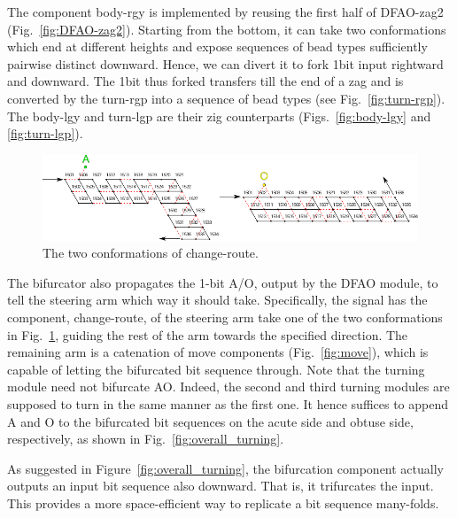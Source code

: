 The component body-rgy is implemented by reusing the first half of DFAO-zag2 (Fig.~\ref{fig:DFAO-zag2}). 
Starting from the bottom, it can take two conformations which end at different heights and expose sequences of bead types sufficiently pairwise distinct downward. 
Hence, we can divert it to fork 1bit input rightward and downward. 
The 1bit thus forked transfers till the end of a zag and is converted by the turn-rgp into a sequence of bead types (see Fig.~\ref{fig:turn-rgp}). 
The body-lgy and turn-lgp are their zig counterparts (Figs.~\ref{fig:body-lgy} and \ref{fig:turn-lgp}). 


\begin{figure}[h]
\centering
\includegraphics[width=\linewidth]{pic/change_route.pdf}
\caption{The two conformations of change-route.}
\label{fig:change_route}
\end{figure}

The bifurcator also propagates the 1-bit A/O, output by the DFAO module, to tell the steering arm which way it should take.
Specifically, the signal has the component, change-route, of the steering arm take one of the two conformations in Fig.~\ref{fig:change_route}, guiding the rest of the arm towards the specified direction.
The remaining arm is a catenation of move components (Fig.~\ref{fig:move}), which is capable of letting the bifurcated bit sequence through.  
Note that the turning module need not bifurcate AO.
Indeed, the second and third turning modules are supposed to turn in the same manner as the first one.
It hence suffices to append A and O to the bifurcated bit sequences on the acute side and obtuse side, respectively, as shown in Fig.~\ref{fig:overall_turning}.

\begin{remark}
As suggested in Figure~\ref{fig:overall_turning}, the bifurcation component actually outputs an input bit sequence also downward.
That is, it trifurcates the input.
This provides a more space-efficient way to replicate a bit sequence many-folds.
\end{remark}

